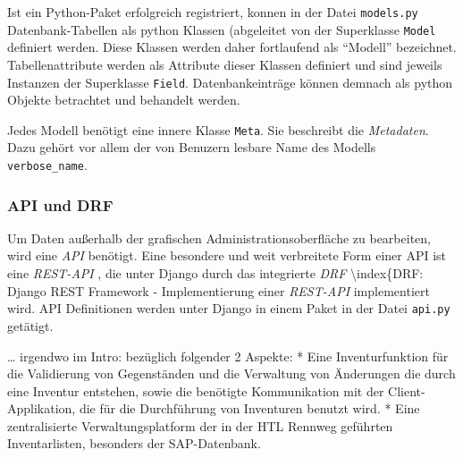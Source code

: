 Ist ein Python-Paket erfolgreich registriert, konnen in der Datei
\texttt{models.py} Datenbank-Tabellen als python Klassen (abgeleitet von
der Superklasse \texttt{Model}\cite{django-doku-models} definiert
werden. Diese Klassen werden daher fortlaufend als ``Modell''
bezeichnet. Tabellenattribute werden als Attribute dieser Klassen
definiert und sind jeweils Instanzen der Superklasse
\texttt{Field}\cite{django-doku-models}. Datenbankeinträge können
demnach als python Objekte betrachtet und behandelt werden.

Jedes Modell benötigt eine innere Klasse \texttt{Meta}. Sie beschreibt
die
\emph{Metadaten}.
Dazu gehört vor allem der von Benuzern lesbare Name des Modells
\texttt{verbose\_name}. \cite{django-doku-models-options}

\hypertarget{api-und-drf}{%
\subsubsection{API und DRF}\label{api-und-drf}}

Um Daten außerhalb der grafischen Administrationsoberfläche zu
bearbeiten, wird eine
\emph{API}
benötigt. Eine besondere und weit verbreitete Form einer API ist eine
\emph{REST-API}
\cite{rest-api}, die unter Django durch das integrierte \emph{DRF}
\textbackslash index\{DRF: Django REST Framework - Implementierung einer
\emph{REST-API}
implementiert wird.\cite{django-rest-framework} API Definitionen werden
unter Django in einem Paket in der Datei \texttt{api.py} getätigt.


\ldots{} irgendwo im Intro: bezüglich folgender 2 Aspekte: * Eine
Inventurfunktion für die Validierung von Gegenständen und die Verwaltung
von Änderungen die durch eine Inventur entstehen, sowie die benötigte
Kommunikation mit der Client-Applikation, die für die Durchführung von
Inventuren benutzt wird. * Eine zentralisierte Verwaltungsplatform der
in der HTL Rennweg geführten Inventarlisten, besonders der
SAP-Datenbank.
